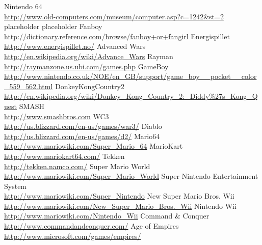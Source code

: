 \begin{thebibliography}{1} %
	Nintendo 64\\\url{http://www.old-computers.com/museum/computer.asp?c=1242&st=2}
	placeholder
	placeholder
	Fanboy\\\url{http://dictionary.reference.com/browse/fanboy+or+fangirl}
	Energispillet\\\url{http://www.energispillet.no/}
	Advanced Wars\\\url{http://en.wikipedia.org/wiki/Advance\_Wars}
	Rayman\\\url{http://raymanzone.us.ubi.com/games.php}
	GameBoy\\\url{http://www.nintendo.co.uk/NOE/en_GB/support/game_boy__pocket__color_559_562.html}
	DonkeyKongCountry2\\\url{http://en.wikipedia.org/wiki/Donkey_Kong_Country_2:_Diddy%27s_Kong_Quest}
	SMASH\\\url{http://www.smashbros.com}
	WC3\\\url{http://us.blizzard.com/en-us/games/war3/}
	Diablo\\\url{http://us.blizzard.com/en-us/games/d2/}
	Mario64\\\url{http://www.mariowiki.com/Super_Mario_64}
	MarioKart\\\url{http://www.mariokart64.com/}
	Tekken\\\url{http://tekken.namco.com/}
	Super Mario World\\\url{http://www.mariowiki.com/Super_Mario_World}
	Super Nintendo Entertainment System\\\url{http://www.mariowiki.com/Super_Nintendo}
	New Super Mario Bros. Wii\\\url{http://www.mariowiki.com/New_Super_Mario_Bros._Wii}
	Nintendo Wii\\\url{http://www.mariowiki.com/Nintendo_Wii}
	Command \& Conquer\\\url{http://www.commandandconquer.com/}
	Age of Empires\\\url{http://www.microsoft.com/games/empires/}
\end{thebibliography}